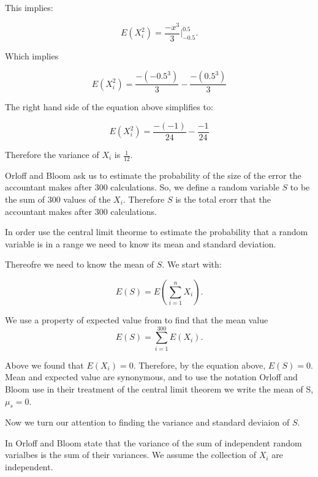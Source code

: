 \documentclass[a4paper,11pt]{article}
\begin{document}
This implies:

\begin{equation}
  E\left(X_i^2 \right) = \frac{-x^3}{3} \bigg\rvert_{-0.5}^{0.5}.
\end{equation}

Which implies

\begin{equation}
  E\left(X_i^2 \right) = \frac{-\left(-0.5^3 \right)}{3}
  - \frac{-\left(0.5^3 \right)}{3}
\end{equation}

The right hand side of the equation above simplifies to:

\begin{equation}
  E\left(X_i^2 \right) = \frac{-\left(-1 \right)}{24}
  - \frac{-1}{24}
\end{equation}

Therefore the variance of $X_i$ is $\frac{1}{12}$.

Orloff and Bloom ask us to estimate the probability of the size of the error the accountant
makes after 300 calculations.  So, we define a random variable $S$ to be the
sum of 300 values of the $X_i$. Therefore $S$ is the total erorr that the
accountant makes after 300 calculations.

In order use the central limit theorme to estimate the probability that a random
variable is in a range we need to know its mean and standard deviation.

Thereofre we need to know the mean of $S$.  We start with:

\begin{equation}
E\left(S \right) = E\left(\sum_{i=1}^n X_i \right).
\end{equation}

We use a property of expected value from \cite{reading6a} to find that the mean value
\begin{equation}
E\left(S \right) = \sum_{i=1}^300 E\left(X_i \right).
\end{equation}

Above we found that $E\left(X_i \right)=0$.  Therefore, by the equation above,
$E\left(S \right) = 0$. Mean and expected value are synonymous, and to use
the notation Orloff and Bloom use in their treatment of the central limit
theorem we write the mean of S, $\mu_s=0$.

Now we turn our attention to finding the variance and standard deviaion of $S$.

In \cite{reading6a} Orloff and Bloom state that the variance of the
sum of independent random varialbes is the sum of their variances. We assume the
collection of $X_i$ are independent.
\end{document}
